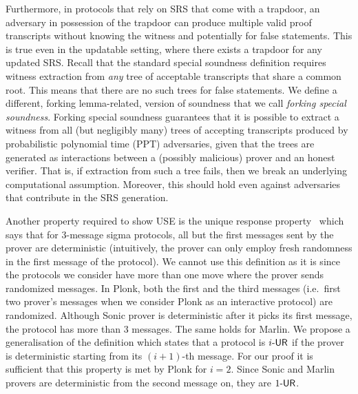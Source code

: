 Furthermore, in protocols that rely on SRS that come with a trapdoor, an adversary in
possession of the trapdoor can produce multiple valid proof transcripts without
knowing the witness and potentially for false statements. This is true even in
the updatable setting, where there exists a trapdoor for any updated SRS. Recall
that the standard special soundness definition requires witness extraction from
\emph{any} tree of acceptable transcripts that share a common root. This means
that there are no such trees for false statements. We define a different,
forking lemma-related, version of soundness that we call \emph{forking special soundness}.
Forking special soundness guarantees that it is possible to extract a witness from all
(but negligibly many) trees of accepting transcripts produced by probabilistic
polynomial time (PPT) adversaries, given that the trees are generated as
interactions between a (possibly malicious) prover and an honest verifier. That
is, if extraction from such a tree fails, then we break an underlying
computational assumption. Moreover, this should hold even against adversaries
that contribute in the SRS generation.

  Another property
required to show USE is the unique response property~\cite{C:Fischlin05} which says
that for $3$-message sigma protocols, all but the first messages sent by the prover are
deterministic (intuitively, the prover can only employ fresh randomness in the first
message of the protocol). We cannot use this definition as it is since the protocols
we consider have more than one move where the prover sends randomized messages. In
Plonk, both the first and the third messages (i.e.~first two prover's messages when
we consider Plonk as an interactive protocol) are randomized. Although Sonic prover
is deterministic after it picks its first message, the protocol has more than $3$
messages. The same holds for Marlin. We propose a generalisation of the definition which
states that a protocol is ${i\text{-}\mathsf{UR}}$ if the prover is deterministic starting from its
$(i + 1)$-th message. For our proof it is sufficient that this property is met by Plonk
for $i = 2$. Since Sonic and Marlin provers are deterministic from the second message
on, they are ${1\text{-}\mathsf{UR}}$.


